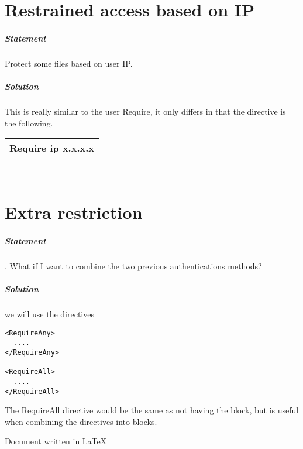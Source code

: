\documentclass[a4paper,10pt]{article}
\begin{document}
\section{Restrained access based on IP}
\subparagraph{Statement}
Protect some files based on user IP.
\subparagraph{Solution}
This is really similar to the user Require, it only differs in that the directive is the following.
\vspace{0.5cm}\\\begin{tabular}{|l|}\hline
Require ip x.x.x.x
\\\hline\end{tabular}\vspace{0.5cm}\\

\section{Extra restriction}
\subparagraph{Statement}.
What if I want to combine the two previous authentications methods?
\subparagraph{Solution}
we will use the directives
\begin{verbatim}
<RequireAny>
  ....
</RequireAny>

<RequireAll>
  ....
</RequireAll>
\end{verbatim}
The RequireAll directive would be the same as not having the block, but is useful when combining the directives into blocks.

\vspace*{\fill} %
\raggedleft Document written in \LaTeX{}
\end{document}
